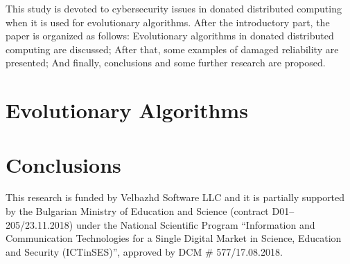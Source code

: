 \documentclass[graybox]{svmult}
\begin{document}
This study is devoted to cybersecurity issues in donated distributed computing when it is used for evolutionary algorithms. After the introductory part, the paper is organized as follows: Evolutionary algorithms in donated distributed computing are discussed; After that, some examples of damaged reliability are presented; And finally, conclusions and some further research are proposed. 

\section{Evolutionary Algorithms}
\label{sec:02}

\section{Conclusions}
\label{sec:03}

\begin{acknowledgement}
This research is funded by Velbazhd Software LLC and it is partially supported by the Bulgarian Ministry of Education and Science (contract D01–205/23.11.2018) under the National Scientific Program ``Information and Communication Technologies for a Single Digital Market in Science, Education and Security (ICTinSES)'', approved by DCM \# 577/17.08.2018.
\end{acknowledgement}


\end{document}
